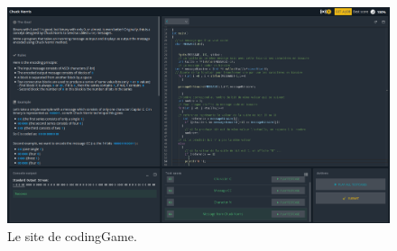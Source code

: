 \documentclass[a4paper]{article}
\begin{document}
 \begin{figure}[!htb]
      \centering
      \includegraphics[width=.9
      \linewidth]{./img_rapport/img_coding_game.png}
      \caption{Le site de codingGame.}
      \label{fig-coding-game}
 \end{figure}
\end{document}
